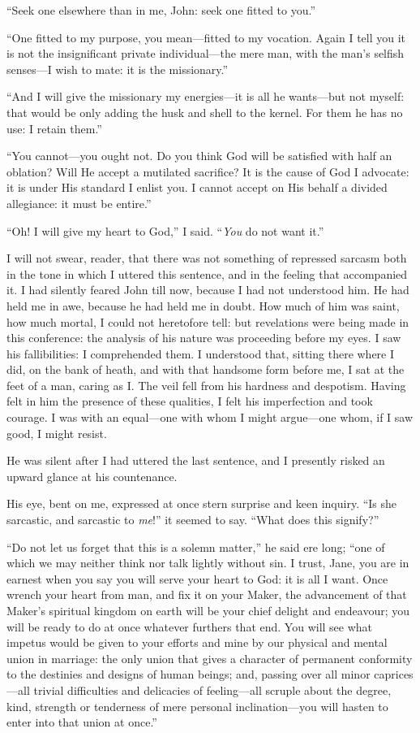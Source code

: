\enquote{Seek one elsewhere than in me, \St{} John: seek one fitted to
	you.}

\enquote{One fitted to my purpose, you mean---fitted to my vocation.
	Again I tell you it is not the insignificant private individual---the
	mere man, with the man's selfish senses---I wish to mate: it is the
	missionary.}

\enquote{And I will give the missionary my energies---it is all he
	wants---but not myself: that would be only adding the husk and shell to
	the kernel. For them he has no use: I retain them.}

\enquote{You cannot---you ought not. Do you think God will be satisfied
	with half an oblation? Will He accept a mutilated sacrifice? It is the
	cause of God I advocate: it is under His standard I enlist you. I
	cannot accept on His behalf a divided allegiance: it must be entire.}

\enquote{Oh! I will give my heart to God,} I said. \enquote{\emph{You} do not
	want it.}

I will not swear, reader, that there was not something of repressed
sarcasm both in the tone in which I uttered this sentence, and in the
feeling that accompanied it. I had silently feared \St{} John till now,
because I had not understood him. He had held me in awe, because he had
held me in doubt. How much of him was saint, how much mortal, I could
not heretofore tell: but revelations were being made in this conference:
the analysis of his nature was proceeding before my eyes. I saw his
fallibilities: I comprehended them. I understood that, sitting there
where I did, on the bank of heath, and with that handsome form before
me, I sat at the feet of a man, caring as I\@. The veil fell from his
hardness and despotism. Having felt in him the presence of these
qualities, I felt his imperfection and took courage. I was with an
equal---one with whom I might argue---one whom, if I saw good, I might
resist.

He was silent after I had uttered the last sentence, and I presently
risked an upward glance at his countenance.

His eye, bent on me, expressed at once stern surprise and keen inquiry.
\enquote{Is she sarcastic, and sarcastic to \emph{me}!} it seemed to say.
\enquote{What does this signify?}

\enquote{Do not let us forget that this is a solemn matter,} he said ere
long; \enquote{one of which we may neither think nor talk lightly
	without sin. I trust, Jane, you are in earnest when you say you will
	serve your heart to God: it is all I want. Once wrench your heart from
	man, and fix it on your Maker, the advancement of that Maker's spiritual
	kingdom on earth will be your chief delight and endeavour; you will be
	ready to do at once whatever furthers that end. You will see what
	impetus would be given to your efforts and mine by our physical and
	mental union in marriage: the only union that gives a character of
	permanent conformity to the destinies and designs of human beings; and,
	passing over all minor caprices---all trivial difficulties and
	delicacies of feeling---all scruple about the degree, kind, strength or
	tenderness of mere personal inclination---you will hasten to enter into
	that union at once.}


